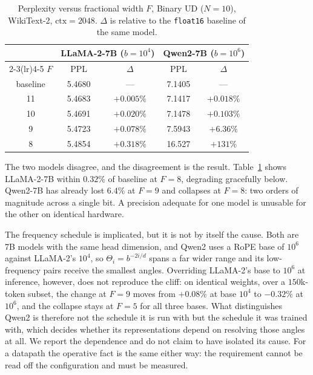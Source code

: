 \documentclass[conference]{IEEEtran}
\begin{document}
\begin{table}[t]
\caption{Perplexity versus fractional width $F$, Binary UD ($N=10$),
WikiText-2, $\mathrm{ctx}=2048$. $\Delta$ is relative to the
\texttt{float16} baseline of the same model.}
\label{tab:fsweep}
\centering
\begin{tabular}{ccccc}
\toprule
& \multicolumn{2}{c}{LLaMA-2-7B ($b{=}10^{4}$)} & \multicolumn{2}{c}{Qwen2-7B ($b{=}10^{6}$)} \\
\cmidrule(lr){2-3}\cmidrule(lr){4-5}
$F$ & PPL & $\Delta$ & PPL & $\Delta$ \\
\midrule
baseline & 5.4680 & ---        & 7.1405 & --- \\
11       & 5.4683 & $+0.005\%$ & 7.1417 & $+0.018\%$ \\
10       & 5.4691 & $+0.020\%$ & 7.1478 & $+0.103\%$ \\
9        & 5.4723 & $+0.078\%$ & 7.5943 & $+6.36\%$ \\
8        & 5.4854 & $+0.318\%$ & 16.527 & $+131\%$ \\
\bottomrule
\end{tabular}
\end{table}

The two models disagree, and the disagreement is the result.
Table~\ref{tab:fsweep} shows LLaMA-2-7B within $0.32\%$ of baseline at $F=8$,
degrading gracefully below. Qwen2-7B has already lost $6.4\%$ at $F=9$ and
collapses at $F=8$: two orders of magnitude across a single bit. A precision
adequate for one model is unusable for the other on identical hardware.

The frequency schedule is implicated, but it is not by itself the cause. Both
are 7B models with the same head dimension, and Qwen2 uses a RoPE base of
$10^{6}$ against LLaMA-2's $10^{4}$, so $\Theta_i = b^{-2i/d}$ spans a far wider
range and its low-frequency pairs receive the smallest angles. Overriding
LLaMA-2's base to $10^{6}$ at inference, however, does not reproduce the cliff:
on identical weights, over a $150$k-token subset, the change at $F=9$ moves
from $+0.08\%$ at base $10^{4}$ to $-0.32\%$ at $10^{6}$, and the collapse stays
at $F=5$ for all three bases.
What distinguishes Qwen2 is therefore not the schedule it is run with but the
schedule it was trained with, which decides whether its representations depend
on resolving those angles at all. We report the dependence and do not claim to
have isolated its cause. For a datapath the operative fact is the same either
way: the requirement cannot be read off the configuration and must be
measured.
\end{document}
